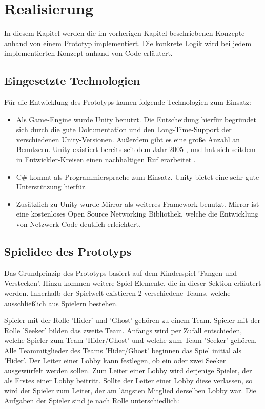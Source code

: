 \chapter{Realisierung}
\label{sec:realisierung}

In diesem Kapitel werden die im vorherigen Kapitel beschriebenen Konzepte anhand von einem Prototyp implementiert. Die konkrete Logik wird bei jedem implementierten Konzept anhand von Code erläutert.

\section{Eingesetzte Technologien}

Für die Entwicklung des Prototyps kamen folgende Technologien zum Einsatz:

\begin{itemize}
	\item Als Game-Engine wurde Unity \cite{Technologies.03.02.2022} benutzt. Die Entscheidung hierfür begründet sich durch die gute Dokumentation und den Long-Time-Support der verschiedenen Unity-Versionen. Außerdem gibt es eine große Anzahl an Benutzern. Unity existiert bereits seit dem Jahr 2005 , und hat sich seitdem in Entwickler-Kreisen einen nachhaltigen Ruf erarbeitet \cite{Wikipedia.2022c}.
	\item C\# kommt als Programmiersprache zum Einsatz. Unity bietet eine sehr gute Unterstützung hierfür.
	\item Zusätzlich zu Unity wurde Mirror\cite{.03.02.2022} als weiteres Framework benutzt. Mirror ist eine kostenloses Open Source Networking Bibliothek, welche die Entwicklung von Netzwerk-Code deutlich erleichtert.
\end{itemize}

\section{Spielidee des Prototyps}
\label{Spielidee}

Das Grundprinzip des Prototyps basiert auf dem Kinderspiel 'Fangen und Verstecken'. Hinzu kommen weitere Spiel-Elemente, die in dieser Sektion erläutert werden. Innerhalb der Spielwelt existieren 2 verschiedene Teams, welche ausschließlich aus Spielern bestehen.

Spieler mit der Rolle 'Hider' und 'Ghost' gehören zu einem Team.  Spieler mit der Rolle 'Seeker' bilden das zweite Team. Anfangs wird per Zufall entschieden, welche Spieler zum Team 'Hider/Ghost' und welche zum Team 'Seeker' gehören. Alle Teammitglieder des Teams 'Hider/Ghost' beginnen das Spiel initial als 'Hider'. Der Leiter einer Lobby kann festlegen, ob ein oder zwei Seeker ausgewürfelt werden sollen. Zum Leiter einer Lobby wird derjenige Spieler, der als Erstes einer Lobby beitritt. Sollte der Leiter einer Lobby diese verlassen, so wird der Spieler zum Leiter, der am längsten Mitglied derselben Lobby war. Die Aufgaben der Spieler sind je nach Rolle unterschiedlich:

